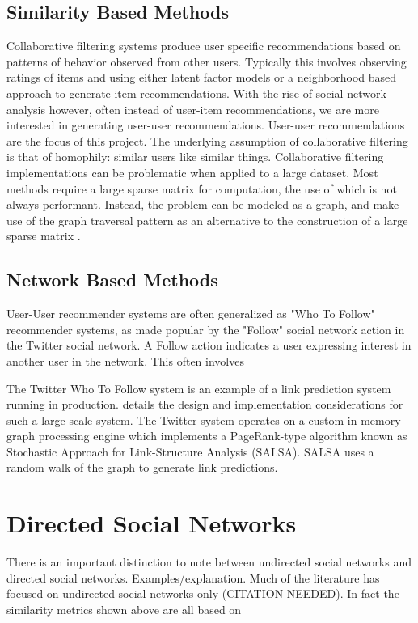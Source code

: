\subsection{Similarity Based Methods}

Collaborative filtering systems produce user specific recommendations based on patterns of behavior observed from other users. Typically this involves observing ratings of items and using either latent factor models or a neighborhood based approach to generate item recommendations\cite{cf}. With the rise of social network analysis however, often instead of user-item recommendations, we are more interested in generating user-user recommendations. User-user recommendations are the focus of this project. The underlying assumption of collaborative filtering is that of homophily: similar users like similar things. Collaborative filtering implementations can be problematic when applied to a large dataset. Most methods require a large sparse matrix for computation, the use of which is not always performant. Instead, the problem can be modeled as a graph, and make use of the graph traversal pattern as an alternative to the construction of a large sparse matrix \cite{Rodriguez}.

\subsection{Network Based Methods}

User-User recommender systems are often generalized as "Who To Follow" recommender systems, as made popular by the "Follow" social network action in the Twitter social network. A Follow action indicates a user expressing interest in another user in the network. This often involves 

The Twitter Who To Follow system is an example of a link prediction system running in production. \cite{wtf} details the design and implementation considerations for such a large scale system. The Twitter system operates on a custom in-memory graph processing engine which implements a PageRank-type algorithm known as Stochastic Approach for Link-Structure Analysis (SALSA). SALSA uses a random walk of the graph to generate link predictions.

\section{Directed Social Networks}
There is an important distinction to note between undirected social networks and directed social networks. Examples/explanation. Much of the literature has focused on undirected social networks only (CITATION NEEDED). In fact the similarity metrics shown above are all based on 